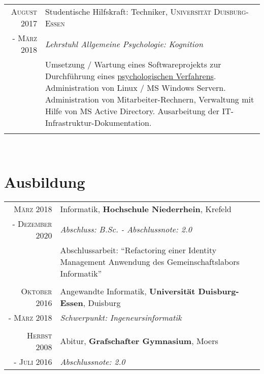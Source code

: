\documentclass[10pt,a4paper]{article}
\begin{document}
\begin{tabular}{r|p{11cm}}
	 \textsc{August} 2017	& Studentische Hilfskraft: Techniker, \textsc{Universit\"at Duisburg-Essen} \\
	 - \textsc{M\"arz} 2018	& \emph{Lehrstuhl Allgemeine Psychologie: Kognition} \\
						& \footnotesize{Umsetzung / Wartung eines Softwareprojekts zur Durchf\"uhrung eines \href{https://gdt.allgpsy.uni-due.de}{psychologischen Verfahrens}. Administration von Linux / MS Windows Servern. Administration von Mitarbeiter-Rechnern, Verwaltung mit Hilfe von MS Active Directory. Ausarbeitung der IT-Infrastruktur-Dokumentation.} \\
	 \multicolumn{2}{c}{} \\
\end{tabular} \\


\section{Ausbildung}

\begin{tabular}{r|p{11cm}}

	\textsc{M\"arz} 2018		& Informatik, \textbf{Hochschule Niederrhein}, Krefeld \\
	- \textsc{Dezember 2020}	& \emph{Abschluss: B.Sc. - Abschlussnote: 2.0} \\
						& Abschlussarbeit: ``Refactoring einer Identity Management Anwendung des Gemeinschaftslabors Informatik'' \\
	\multicolumn{2}{c}{} \\
	
	\textsc{Oktober} 2016	& Angewandte Informatik, \textbf{Universit\"at Duisburg-Essen}, Duisburg \\
	- \textsc{M\"arz} 2018	& \emph{Schwerpunkt: Ingeneursinformatik} \\
	\multicolumn{2}{c}{} \\
	
	\textsc{Herbst} 2008		& Abitur, \textbf{Grafschafter Gymnasium}, Moers \\
	- \textsc{Juli} 2016		& \emph{Abschlussnote: 2.0} \\
\end{tabular} \\
\end{document}

